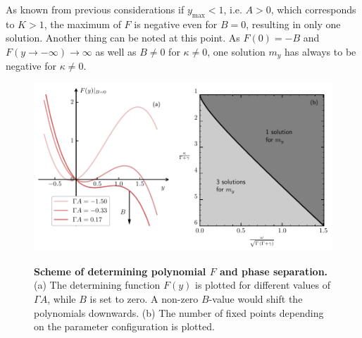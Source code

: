As known from previous considerations if $y_\text{max}<1$, i.e. $A>0$, which corresponds to $K>1$, the maximum of $F$ is negative even for $B=0$, resulting in only one solution. Another thing can be noted at this point. As $F(0)=-B$ and $F(y\rightarrow-\infty)\rightarrow\infty$ as well as $B\neq0$ for $\kappa\neq0$, one solution $m_y$ has always to be negative for $\kappa\neq0$.
\begin{figure}[H]
    \centering
    \caption{\textbf{Scheme of determining polynomial $F$ and phase separation.} (a) The determining function $F(y)$ is plotted for different values of $\Gamma A$, while $B$ is set to zero. A non-zero $B$-value would shift the polynomials downwards. (b) The number of fixed points depending on the parameter configuration is plotted.}
    \includegraphics{pictures/polynomial_scheme_phase.pdf}
    \label{fig:numb_fixp}
\end{figure}


